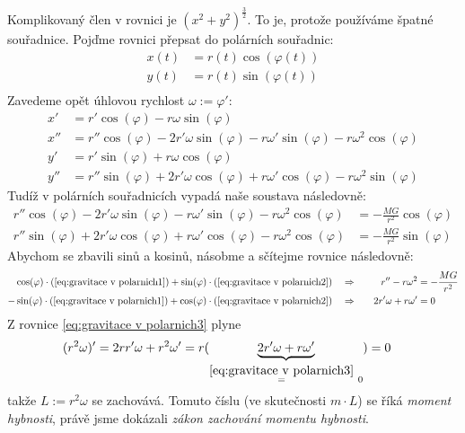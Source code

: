 Komplikovaný člen v rovnici je $(x^{2}+y^{2})^{\frac{3}{2}}.$ To je, protože používáme špatné souřadnice. Pojďme rovnici přepsat do polárních souřadnic:
\begin{align*}
	x(t) &= r(t)\cos(\varphi(t)) \\
	y(t) &= r(t)\sin(\varphi(t)) \\
\end{align*}
Zavedeme opět úhlovou rychlost $\omega:=\varphi':$
\begin{align*}
	x' &= r'\cos(\varphi)-r\omega \sin(\varphi) \\
	x'' &= r''\cos(\varphi)-2r'\omega \sin(\varphi)-r\omega' \sin(\varphi) - r\omega^{2}\cos(\varphi) \\
	y' &= r'\sin(\varphi)+r\omega \cos(\varphi) \\
	y'' &= r''\sin(\varphi) + 2r'\omega\cos(\varphi) +r\omega'\cos(\varphi)- r\omega^{2}\sin(\varphi)
\end{align*}
Tudíž v polárních souřadnicích vypadá naše soustava následovně:
\begin{align}
	r''\cos(\varphi)-2r'\omega \sin(\varphi)-r\omega' \sin(\varphi) - r\omega^{2}\cos(\varphi) &= -\frac{MG}{r^{2}}\cos(\varphi)\label{eq:gravitace v polarnich1} \\
	r''\sin(\varphi) + 2r'\omega\cos(\varphi) +r\omega'\cos(\varphi)- r\omega^{2}\cos(\varphi) &= -\frac{MG}{r^{2}}\sin(\varphi)\label{eq:gravitace v polarnich2}
\end{align}
Abychom se zbavili sinů a kosinů, násobme a sčítejme rovnice následovně:
\begin{alignat}{4}
	\cos(\varphi)\cdot(\ref{eq:gravitace v polarnich1})+\sin(\varphi)\cdot(\ref{eq:gravitace v polarnich2}) \quad &\Rightarrow&\quad r''-r\omega^{2}&=-\frac{MG}{r^{2}}\label{eq:gravitace v polarnich3}  \\
	-\sin(\varphi)\cdot(\ref{eq:gravitace v polarnich1})+\cos(\varphi)\cdot(\ref{eq:gravitace v polarnich2}) \quad &\Rightarrow&\quad 2r'\omega + r\omega' &= 0 \label{eq:gravitace v polarnich4}
\end{alignat}
Z rovnice \ref{eq:gravitace v polarnich3} plyne
\begin{equation*}
	(r^{2}\omega)'=2rr'\omega+r^{2}\omega' = r(\underbrace{2r'\omega+r\omega'}_{\stackrel{\ref{eq:gravitace v polarnich3}}{=}\ 0})=0\quad 
\end{equation*}
takže $L:=r^{2}\omega$ se zachovává. Tomuto číslu (ve skutečnosti $m\cdot L$) se říká \emph{moment hybnosti}, právě jsme dokázali \emph{zákon zachování momentu hybnosti}.

